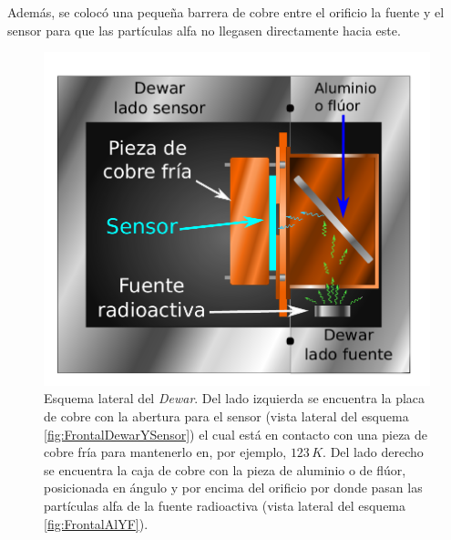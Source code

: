 Además, se colocó una pequeña barrera de cobre entre el orificio la fuente y el sensor para que las partículas alfa no llegasen directamente hacia este.
\begin{figure}%
    \centering
    \includegraphics[scale=0.7]{Figs/LateralDewar.pdf}
    \caption{\footnotesize{Esquema lateral del \textit{Dewar}. Del lado izquierda se encuentra la placa de cobre con la abertura para el sensor (vista lateral del esquema \ref{fig:FrontalDewarYSensor}) el cual está en contacto con una pieza de cobre fría para mantenerlo en, por ejemplo, $123\,\si{K}$. Del lado derecho se encuentra la caja de cobre con la pieza de aluminio o de flúor, posicionada en ángulo y por encima del orificio por donde pasan las partículas alfa de la fuente radioactiva (vista lateral del esquema \ref{fig:FrontalAlYF}).}}
    \label{fig:LateralDewar}
\end{figure}
